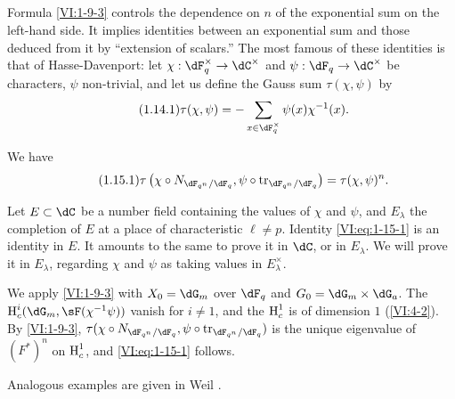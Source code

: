 \subsection{}\label{VI:1-14}

Formula \ref{VI:1-9-3} controls the dependence on $n$ of the
exponential sum on the left-hand side. It implies identities between an
exponential sum and those deduced from it by ``extension of
scalars.'' The most famous of these identities is that of
Hasse-Davenport: let $\chi:\dF_q^\times \to \dC^\times$ and
$\psi:\dF_q\to \dC^\times$ be characters, $\psi$ non-trivial, and
let us define the Gauss sum $\tau(\chi,\psi)$ by 
\begin{equation*}\tag{1.14.1}\label{VI:eq:1-14-1}
  \tau(\chi,\psi) = - \sum_{x\in \dF_q^\times} \psi(x) \chi^{-1}(x) \text{.}
\end{equation*}





\begin{theorem_}\label{VI:1-15}
We have 
\begin{equation*}\tag{1.15.1}\label{VI:eq:1-15-1}
  \tau\left(\chi\circ N_{\dF_{q^n}/\dF_q},\psi\circ \tr_{\dF_{q^n}/\dF_q}\right) = \tau(\chi,\psi)^n \text{.}
\end{equation*}
\end{theorem_}

Let $E\subset \dC$ be a number field containing the values of $\chi$ and
$\psi$, and $E_\lambda$ the completion of $E$ at a place of
characteristic $\ell\ne p$. Identity \eqref{VI:eq:1-15-1} is an identity in $E$. It
amounts to the same to prove it in $\dC$, or in $E_\lambda$. We will
prove it in $E_\lambda$, regarding $\chi$ and $\psi$ as taking values
in $E_\lambda^\times$.

We apply \ref{VI:1-9-3} with $X_0=\dG_m$ over $\dF_q$ and
$G_0=\dG_m\times \dG_a$. The $\h_c^i(\dG_m,\sF(\chi^{-1}\psi))$ vanish for
$i\ne 1$, and the $\operatorname{H}_c^1$ is of dimension $1$ (\ref{VI:4-2}). By
\ref{VI:1-9-3},
$\tau(\chi\circ N_{\dF_{q^n}/\dF_q},\psi\circ \tr_{\dF_{q^n}/\dF_q})$ is
the unique eigenvalue of $(F^\ast)^n$ on $\operatorname{H}_c^1$, and \eqref{VI:eq:1-15-1}
follows.

Analogous examples are given in Weil \cite[App V]{we74}. 





\subsection{}\label{VI:1-16}

